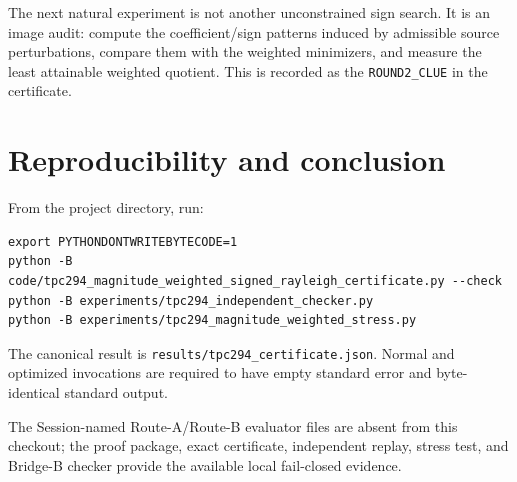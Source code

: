 \documentclass[10pt]{article}
\begin{document}
The next natural experiment is not another unconstrained sign search.  It is
an image audit: compute the coefficient/sign patterns induced by admissible
source perturbations, compare them with the weighted minimizers, and measure
the least attainable weighted quotient.  This is recorded as the
\texttt{ROUND2\_CLUE} in the certificate.

\section{Reproducibility and conclusion}

From the project directory, run:
\begin{verbatim}
export PYTHONDONTWRITEBYTECODE=1
python -B code/tpc294_magnitude_weighted_signed_rayleigh_certificate.py --check
python -B experiments/tpc294_independent_checker.py
python -B experiments/tpc294_magnitude_weighted_stress.py
\end{verbatim}
The canonical result is
\texttt{results/tpc294\_certificate.json}.  Normal and optimized invocations
are required to have empty standard error and byte-identical standard output.

The Session-named Route-A/Route-B evaluator files are absent from this
checkout; the proof package, exact certificate, independent replay, stress
test, and Bridge-B checker provide the available local fail-closed evidence.



\end{document}
